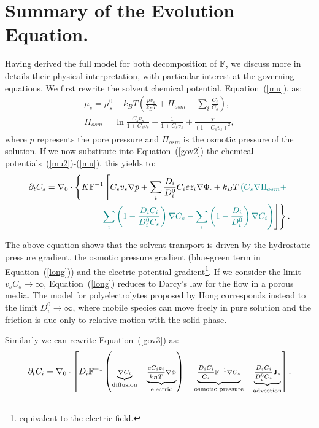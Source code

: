 \section{Summary of the Evolution Equation.}

Having derived the full model for both decomposition of $\mathbb{F}$, we discuss more in details their physical interpretation, with particular interest at the governing equations. We first rewrite the solvent chemical potential, Equation~(\ref{mu}), as:
\begin{gather}
\mu_s = \mu^0_s + k_B T \left(\frac{p v_s}{k_BT} +\Pi_{osm}-\sum_i \frac{C_i}{C_s}\right)\label{mu2},\\
\Pi_{osm}=\ln \frac{C_s v_s}{1+C_s v_s} + \frac{1}{1+C_sv_s}+\frac{\chi}{(1+C_s v_s)^2},
\end{gather}
where $p$ represents the pore pressure and $\Pi_{osm}$ is the osmotic pressure of the solution. If we now substitute into Equation~(\ref{gov2}) the chemical potentials~(\ref{mu2})-(\ref{mu}), this yields to:
\begin{equation}
\begin{aligned}
\partial_t C_s=\nabla_0 \cdot\left\{K\mathbb{F}^{-1}\left[C_s v_s\nabla p +\sum_i \frac{D_i}{D^0_i} C_i e z_i \nabla \Phi.+ k_B T\color{teal} \left(C_s \nabla \Pi_{osm}+  \right.\right.\right.\\
\left.\left.\left.\color{teal} \sum_i\left(1-\frac{D_iC_i}{D^0_iC_s}\right) \nabla C_s- \sum_i\left(1-\frac{D_i}{D^0_i}\right) \nabla C_i \right)\color{black}\right]\right\}.\label{long}
\end{aligned}
\end{equation}

The above equation shows that the solvent transport is driven by the hydrostatic pressure gradient, the osmotic pressure gradient (blue-green term in Equation~(\ref{long})) and the electric potential gradient\footnote{equivalent to the electric field.}. If we consider the limit $v_sC_s\rightarrow\infty$, Equation~(\ref{long}) reduces to Darcy's law for the flow in a porous media. The model for polyelectrolytes proposed by Hong \cite{Reviewpolyel} corresponds instead to the limit $D^0_i\rightarrow\infty$, where mobile species can move freely in pure solution and the friction is due only to relative motion with the solid phase.

Similarly we can rewrite Equation~(\ref{gov3}) as:
\begin{equation}
\scriptsize
\partial_t C_i = \nabla_0 \cdot\left[D_i\mathbb{F}^{-1}\left(\underbrace{\nabla C_i}_{\text{diffusion}} +\underbrace{\frac{eC_iz_i}{k_B T} \nabla \Phi}_{\text{electric}}\right)-\underbrace{\frac{D_i C_i}{C_s}\mathbb{F}^{-1}\nabla C_s}_{\text{osmotic pressure}}-\underbrace{\frac{D_i C_i}{D^0_iC_s}\mathbf{J}_s}_{\text{advection}}\right].\label{long2}
\end{equation}

